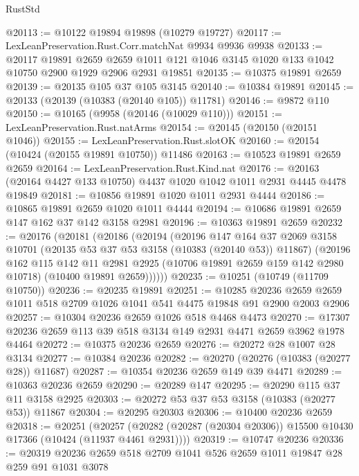 \begin{lexlean}{RustStd}
\begin{coremodule}
@20113 := @10122 @19894 @19898 (@10279 @19727)
@20117 := LexLeanPreservation.Rust.Corr.matchNat @9934 @9936 @9938
@20133 := @20117
    @19891
    @2659
    @2659
    @1011
    @121
    @1046
    @3145
    @1020
    @133
    @1042
    @10750
    @2900
    @1929
    @2906
    @2931
    @19851
@20135 := @10375 @19891 @2659
@20139 := @20135 @105 @37 @105 @3145
@20140 := @10384 @19891
@20145 := @20133 (@20139 (@10383 (@20140 @105)) @11781)
@20146 := @9872 @110
@20150 := @10165 (@9958 (@20146 (@10029 @110)))
@20151 := LexLeanPreservation.Rust.natArms
@20154 := @20145 (@20150 (@20151 @1046))
@20155 := LexLeanPreservation.Rust.slotOK
@20160 := @20154 (@10424 (@20155 @19891 @10750)) @11486
@20163 := @10523 @19891 @2659 @2659
@20164 := LexLeanPreservation.Rust.Kind.nat
@20176 := @20163 (@20164 @4427 @133 @10750) @4437 @1020 @1042 @1011 @2931 @4445 @4478 @19849
@20181 := @10856 @19891 @1020 @1011 @2931 @4444
@20186 := @10865 @19891 @2659 @1020 @1011 @4444
@20194 := @10686 @19891 @2659 @147 @162 @37 @142 @3158 @2981
@20196 := @10363 @19891 @2659
@20232 := @20176
    (@20181
      (@20186
        (@20194
          (@20196
            @147
            @164
            @37
            @2069
            @3158
            @10701
            (@20135 @53 @37 @53 @3158 (@10383 (@20140 @53)) @11867)
            (@20196
              @162
              @115
              @142
              @11
              @2981
              @2925
              (@10706 @19891 @2659 @159 @142 @2980 @10718)
              (@10400 @19891 @2659))))))
@20235 := @10251 (@10749 (@11709 @10750))
@20236 := @20235 @19891
@20251 := @10285
    @20236
    @2659
    @2659
    @1011
    @518
    @2709
    @1026
    @1041
    @541
    @4475
    @19848
    @91
    @2900
    @2003
    @2906
@20257 := @10304 @20236 @2659 @1026 @518 @4468 @4473
@20270 := @17307 @20236 @2659 @113 @39 @518 @3134 @149 @2931 @4471 @2659 @3962 @1978 @4464
@20272 := @10375 @20236 @2659
@20276 := @20272 @28 @1007 @28 @3134
@20277 := @10384 @20236
@20282 := @20270 (@20276 (@10383 (@20277 @28)) @11687)
@20287 := @10354 @20236 @2659 @149 @39 @4471
@20289 := @10363 @20236 @2659
@20290 := @20289 @147
@20295 := @20290 @115 @37 @11 @3158 @2925
@20303 := @20272 @53 @37 @53 @3158 (@10383 (@20277 @53)) @11867
@20304 := @20295 @20303
@20306 := @10400 @20236 @2659
@20318 := @20251
    (@20257 (@20282 (@20287 (@20304 @20306)) @15500 @10430 @17366 (@10424 (@11937 @4461 @2931))))
@20319 := @10747 @20236
@20336 := @20319
    @20236
    @2659
    @518
    @2709
    @1041
    @526
    @2659
    @1011
    @19847
    @28
    @259
    @91
    @1031
    @3078

\end{coremodule}
\end{lexlean}
